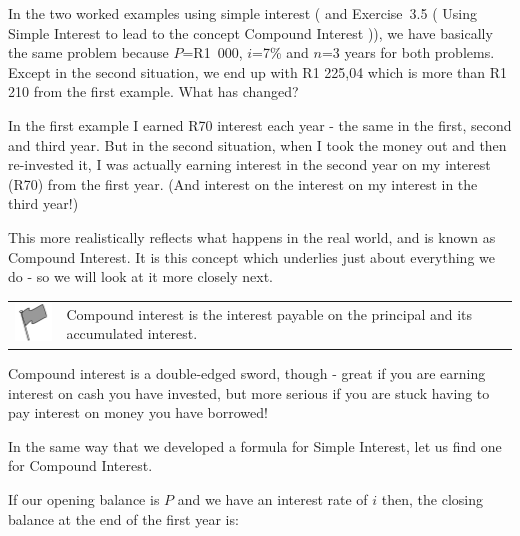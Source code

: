     \noindent
      \label{m39334*id72585}In the two worked examples using simple interest ( and Exercise~3.5 ( Using Simple Interest to lead to the concept Compound Interest )), we have basically the same problem because $P$=R1~000, $i$=7\% and $n$=3 years for both problems. Except in the second situation, we end up with R1 225,04 which is more than R1 210 from the first example. What has changed?\par 
      \label{m39334*id72618}In the first example I earned R70 interest each year - the same in the first, second and third year. But in the second situation, when I took the money out and then re-invested it, I was actually earning interest in the second year on my interest (R70) from the first year. (And interest on the interest on my interest in the third year!)\par 
      \label{m39334*id72624}This more realistically reflects what happens in the real world, and is known as Compound Interest. It is this concept which underlies just about everything we do - so we will look at it more closely next.\par 
\label{m39334*fhsst!!!underscore!!!id2023}\begin{definition}
	  \begin{tabular*}{15 cm}{m{15 mm}m{}}
	\hspace*{-50pt}  \includegraphics[width=0.5in]{col11306.imgs/psflag2.png}   & \Definition{   \label{id2481335}\textbf{ Compound Interest }} { \label{m39334*meaningfhsst!!!underscore!!!id2023}
      \label{m39334*id72635}Compound interest is the interest payable on the principal and its accumulated interest. \par 
       } 
      \end{tabular*}
      \end{definition}
      \label{m39334*id72647}Compound interest is a double-edged sword, though - great if you are earning interest on cash you have invested, but more serious if you are stuck having to pay interest on money you have borrowed!\par 
      \label{m39334*id72652}In the same way that we developed a formula for Simple Interest, let us find one for Compound Interest.\par 
      \label{m39334*id72656}If our opening balance is $P$ and we have an interest rate of $i$ then, the closing balance at the end of the first year is:\par 
